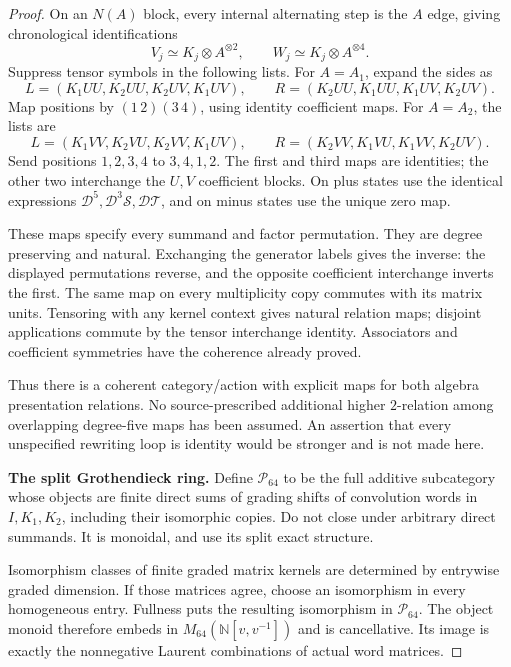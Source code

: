 \begin{proof}
On an $N(A)$ block, every internal alternating step
is the $A$ edge, giving chronological identifications
\[
 V_j\simeq K_j\otimes A^{\otimes2},\qquad
 W_j\simeq K_j\otimes A^{\otimes4}.
\]
Suppress tensor symbols in the following lists.
For $A=A_1$, expand the sides as
\[
 L=(K_1UU,K_2UU,K_2UV,K_1UV),\qquad
 R=(K_2UU,K_1UU,K_1UV,K_2UV).
\]
Map positions by $(1\,2)(3\,4)$, using identity
coefficient maps.
For $A=A_2$, the lists are
\[
 L=(K_1VV,K_2VU,K_2VV,K_1UV),\qquad
 R=(K_2VV,K_1VU,K_1VV,K_2UV).
\]
Send positions $1,2,3,4$ to $3,4,1,2$.
The first and third maps are identities; the other two
interchange the $U,V$ coefficient blocks.
On plus states use the identical expressions
$\mathcal D^5,\mathcal D^3\mathcal S,\mathcal D\mathcal T$,
and on minus states use the unique zero map.

These maps specify every summand and factor permutation.
They are degree preserving and natural.
Exchanging the generator labels gives the inverse:
the displayed permutations reverse, and the opposite
coefficient interchange inverts the first.
The same map on every multiplicity copy commutes with
its matrix units.
Tensoring with any kernel context gives natural relation
maps; disjoint applications commute by the tensor
interchange identity.
Associators and coefficient symmetries have the coherence
already proved.

Thus there is a coherent category/action with explicit
maps for both algebra presentation relations.
No source-prescribed additional higher $2$-relation
among overlapping degree-five maps has been assumed.
An assertion that every unspecified rewriting loop is
identity would be stronger and is not made here.

\par\smallskip\noindent\textbf{The split Grothendieck ring.}\quad
Define $\mathcal P_{64}$ to be the full additive
subcategory whose objects are finite direct sums of
grading shifts of convolution words in $I,K_1,K_2$,
including their isomorphic copies.
Do not close under arbitrary direct summands.
It is monoidal, and use its split exact structure.

Isomorphism classes of finite graded matrix kernels
are determined by entrywise graded dimension.
If those matrices agree, choose an isomorphism in every
homogeneous entry. Fullness puts the resulting
isomorphism in $\mathcal P_{64}$.
The object monoid therefore embeds in
$M_{64}(\mathbb N[v,v^{-1}])$ and is cancellative.
Its image is exactly the nonnegative Laurent
combinations of actual word matrices.


\end{proof}
